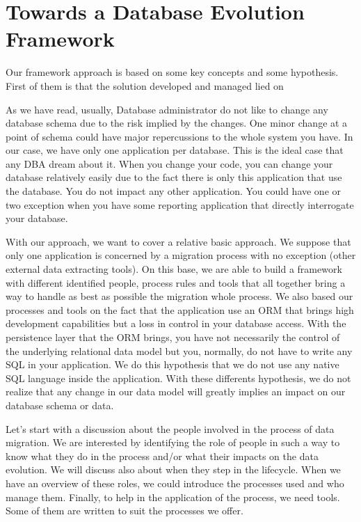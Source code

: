 \section{Towards a Database Evolution Framework}
	\label{sec:def}


Our framework approach is based on some key concepts and some hypothesis. First of them is that the solution developed and managed lied on 

As we have read, usually, Database administrator do not like to change any database schema due to the risk implied by the changes. One minor change at a point of schema could have major repercussions to the whole system you have. In our case, we have only one application per database. This is the ideal case that any DBA dream about it. When you change your code, you can change your database relatively easily due to the fact there is only this application that use the database. You do not impact any other application. You could have one or two exception when you have some reporting application that directly interrogate your database.

With our approach, we want to cover a relative basic approach. We suppose that only one application is concerned by a migration process with no exception (other external data extracting tools). On this base, we are able to build a framework with different identified people, process rules and tools that all together bring a way to handle as best as possible the migration whole process. We also based our processes and tools on the fact that the application use an ORM\cite{orm} that brings high development capabilities but a loss in control in your database access. With the persistence layer that the ORM brings, you have not necessarily the control of the underlying relational data model but you, normally, do not have to write any SQL\cite{sql} in your application. We do this hypothesis that we do not use any native SQL language inside the application. With these differents hypothesis, we do not realize that any change in our data model will greatly implies an impact on our database schema or data.

Let's start with a discussion about the people involved in the process of data migration. We are interested by identifying the role of people in such a way to know what they do in the process and/or what their impacts on the data evolution. We will discuss also about when they step in the lifecycle. When we have an overview of these roles, we could introduce the processes used and who manage them. Finally, to help in the application of the process, we need tools. Some of them are written to suit the processes we offer.

